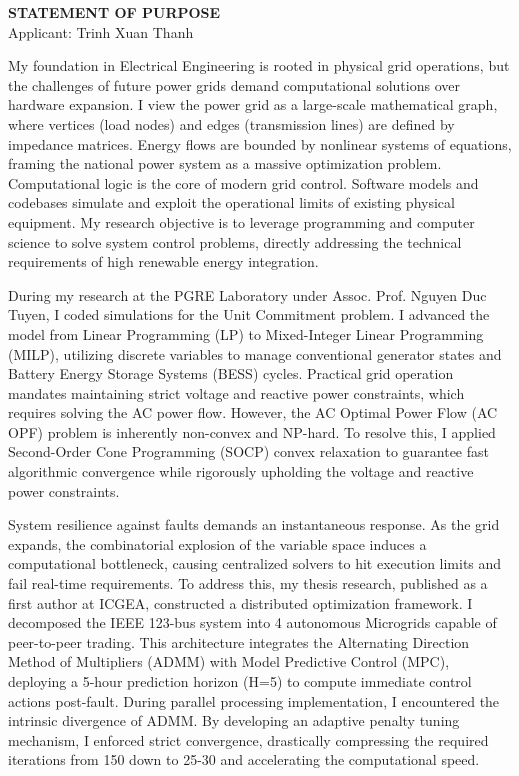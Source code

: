 \documentclass[12pt]{article}
\begin{document}
\begin{center}
    \Large \textbf{STATEMENT OF PURPOSE} \\
    \vspace{0.5em}
    \normalsize Applicant: Trinh Xuan Thanh
\end{center}
\vspace{1em}

My foundation in Electrical Engineering is rooted in physical grid operations, but the challenges of future power grids demand computational solutions over hardware expansion. I view the power grid as a large-scale mathematical graph, where vertices (load nodes) and edges (transmission lines) are defined by impedance matrices. Energy flows are bounded by nonlinear systems of equations, framing the national power system as a massive optimization problem. Computational logic is the core of modern grid control. Software models and codebases simulate and exploit the operational limits of existing physical equipment. My research objective is to leverage programming and computer science to solve system control problems, directly addressing the technical requirements of high renewable energy integration.

During my research at the PGRE Laboratory under Assoc. Prof. Nguyen Duc Tuyen, I coded simulations for the Unit Commitment problem. I advanced the model from Linear Programming (LP) to Mixed-Integer Linear Programming (MILP), utilizing discrete variables to manage conventional generator states and Battery Energy Storage Systems (BESS) cycles. Practical grid operation mandates maintaining strict voltage and reactive power constraints, which requires solving the AC power flow. However, the AC Optimal Power Flow (AC OPF) problem is inherently non-convex and NP-hard. To resolve this, I applied Second-Order Cone Programming (SOCP) convex relaxation to guarantee fast algorithmic convergence while rigorously upholding the voltage and reactive power constraints.

System resilience against faults demands an instantaneous response. As the grid expands, the combinatorial explosion of the variable space induces a computational bottleneck, causing centralized solvers to hit execution limits and fail real-time requirements. To address this, my thesis research, published as a first author at ICGEA, constructed a distributed optimization framework. I decomposed the IEEE 123-bus system into 4 autonomous Microgrids capable of peer-to-peer trading. This architecture integrates the Alternating Direction Method of Multipliers (ADMM) with Model Predictive Control (MPC), deploying a 5-hour prediction horizon (H=5) to compute immediate control actions post-fault. During parallel processing implementation, I encountered the intrinsic divergence of ADMM. By developing an adaptive penalty tuning mechanism, I enforced strict convergence, drastically compressing the required iterations from 150 down to 25-30 and accelerating the computational speed.
\end{document}
